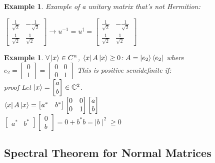 \documentclass[12pt]{article}
\theoremstyle{plain}
\theoremstyle{nonumberplain}
\theoremstyle{plain}
\newtheorem{example}[lemma]{Example}
\theoremstyle{nonumberplain}
\newcommand\1{{\bf 1}}
\newcommand{\bmat}[1]{\begin{bmatrix*} #1 \end{bmatrix*}} %
\newcommand{\C}{\mathbb{C}} %
\newcommand{\<}{\left\langle}
\renewcommand{\>}{\right\rangle}
\begin{document}
\begin{example}
Example of a unitary matrix that's not Hermition: 
\begin{center}
$\bmat{\frac{1}{\sqrt{2}} & -\frac{1}{\sqrt{2}} \\ \frac{1}{\sqrt{2}} & \frac{1}{\sqrt{2}}}\longrightarrow u^{-1}=u^\dagger=\bmat{\frac{1}{\sqrt{2}} & -\frac{1}{\sqrt{2}} \\ \frac{1}{\sqrt{2}} & \frac{1}{\sqrt{2}}}$
\end{center}
\end{example}
\begin{example}
$\forall\ket{x}\in{C^n}$, $\bra{x}A\ket{x}\geq 0$: $A=\ket{e_2}\bra{e_2}$ where $e_2=\bmat{0 \\ 1}=\bmat{0 & 0 \\ 0 & 1}$ This is positive semidefinite if: \\
\textit{proof} Let $\ket{x}=\bmat{a \\ b}\in\C^2$. \\
$\bra{x}A\ket{x}=\bmat{a^* & b^*}\bmat{0 & 0 \\ 0 & 1}\bmat{a \\ b}$ \\
$\bmat{a^* & b^*}\bmat{0 \\ b}=0+b^*b=\mid b\mid^2\geq0$
\end{example}


\subsection{Spectral Theorem for Normal Matrices}
\end{document}
